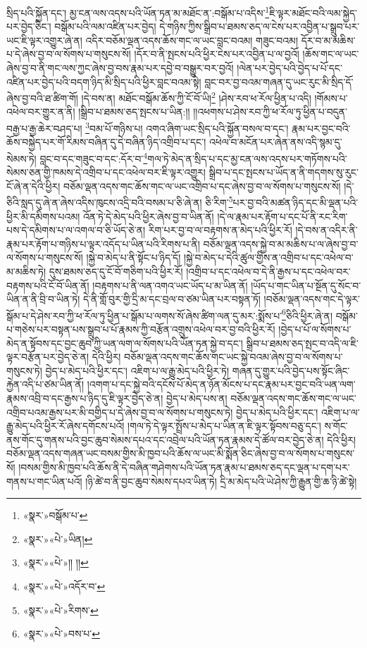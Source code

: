 སྲིད་པའི་སྐྱོན་དང་། མྱ་ངན་ལས་འདས་པའི་ཡོན་ཏན་མ་མཐོང་ན་:བསྒོམ་པ་འདིས་\footnote{«སྣར་»བསྒོམ་པ་}ཇི་ལྟར་མཐོང་བའི་ལམ་སྐྱེད་པར་བྱེད་ཅིང་། བསྒོམ་པའི་ལམ་འཛིན་པར་བྱེད། དེ་གཉིས་ཀྱིས་སྒྲིབ་པ་ཐམས་ཅད་ལ་ངེས་པར་འབྱིན་པ་སྒྲུབ་པར་ཡང་ཇི་ལྟར་འགྱུར་ཞེ་ན། འདིར་བཅོམ་ལྡན་འདས་ཆོས་གང་ལ་ཡང་བླང་བའམ། གཟུང་བའམ། དོར་བ་མ་མཆིས་པ་དེ་ཞེས་བྱ་བ་ལ་སོགས་པ་གསུངས་སོ། །དོར་བ་ནི་སྤངས་པའི་ཕྱིར་ངེས་པར་འབྱིན་པ་ལ་བྱའོ། །ཆོས་གང་ལ་ཡང་ཞེས་བྱ་བ་ནི་གང་ལས་ཀྱང་ཞེས་བྱ་བས་རྣམ་པར་དབྱེ་བ་བསྒྱུར་བར་བྱའོ། །ལེན་པར་བྱེད་པའི་བྱེད་པ་པོ་དང་འཛིན་པར་བྱེད་པའི་བདག་ཉིད་མི་སྲིད་པའི་ཕྱིར་བླང་བའམ་སྟེ། བླང་བར་བྱ་བའམ་གཞན་དུ་ཡང་རུང་མི་སྲིད་དོ་ཞེས་བྱ་བའི་ཐ་ཚིག་གོ། །དེ་བས་ན། མཐོང་བསྒོམ་ཆོས་ཀྱི་ངོ་བོ་ཡི།\footnote{«སྣར་»«པེ་»ཡིན།} །ཤེས་རབ་ཕ་རོལ་ཕྱིན་པ་འདི། །གོམས་པ་འཕེལ་བར་གྱུར་ན་ནི། །སྒྲིབ་པ་ཐམས་ཅད་སྤངས་པ་ཡིན:།། །།འཕགས་པ་ཤེས་རབ་ཀྱི་ཕ་རོལ་ཏུ་ཕྱིན་པ་བདུན་བརྒྱ་པ་རྒྱ་ཆེར་བཤད་པ། \footnote{«སྣར་»«པེ་»།། །། }བམ་པོ་གཉིས་པ། འགའ་ཞིག་ཡང་སྲིད་པའི་སྐྱོན་བསལ་བ་དང་། རྣམ་པར་བྱང་བའི་ཆོས་བསྐྱེད་པར་གོ་རིམས་བཞིན་དུ་དེ་བཞིན་ཉིད་འགྲིབ་པ་དང་། འཕེལ་བ་མངོན་པར་ཞེན་ནས་འདི་སྙམ་དུ་སེམས་ཏེ། བླང་བ་དང་གཟུང་བ་དང་:དོར་བ་\footnote{«སྣར་»«པེ་»འདོར་བ་}གལ་ཏེ་མེད་ན་སྲིད་པ་དང་མྱ་ངན་ལས་འདས་པར་གཏོགས་པའི་སེམས་ཅན་གྱི་ཁམས་དེ་འགྲིབ་པ་དང་འཕེལ་བར་ཇི་ལྟར་འགྱུར། སྒྲིབ་པ་དང་སྤངས་པ་ཡོད་ན་ནི་གདགས་སུ་རུང་ངོ་ཞེ་ན་དེའི་ཕྱིར། བཅོམ་ལྡན་འདས་གང་ཆོས་གང་ལ་ཡང་འགྲིབ་པ་དང་ཞེས་བྱ་བ་ལ་སོགས་པ་གསུངས་སོ། །དེ་ཅིའི་སླད་དུ་ཞེ་ན་ཞེས་འདིས་ཁུངས་འདྲི་བའི་བསམ་པ་ཅི་ཞེ་ན། ཅི་རིག་\footnote{«སྣར་»«པེ་»རིགས་}པར་བྱ་བའི་མཚན་ཉིད་དང་མི་ལྡན་པའི་ཕྱིར་མི་དམིགས་པའམ། འོན་ཏེ་དེ་མེད་པའི་ཕྱིར་ཞེས་བྱ་བ་ཡིན་ནོ། །དེ་ལ་རྣམ་པར་རྟོག་པ་དང་པོ་ནི་རང་རིག་པས་དེ་དམིགས་པ་ལ་འགལ་བ་ཅི་ཡོད་ཅེ་ན། རིག་པར་བྱ་བ་ལ་བརྟགས་ན་མེད་པའི་ཕྱིར་རོ། །དེ་བས་ན་འདིར་ནི་རྣམ་པར་རྟོག་པ་གཉིས་པ་ལྟར་འདོད་པ་ཡིན་པའི་རིགས་པ་ནི། བཅོམ་ལྡན་འདས་སྐྱེ་བ་མ་མཆིས་པ་ལ་ཞེས་བྱ་བ་ལ་སོགས་པ་གསུངས་སོ། །སྐྱེ་བ་མེད་པ་ནི་སྟོང་པ་ཉིད་དོ། །སྐྱེ་བ་མེད་པ་དེའི་ཚུལ་གྱིས་ན་འགྲིབ་པ་དང་འཕེལ་བ་མ་མཆིས་ཏེ། དུས་ཐམས་ཅད་དུ་ངོ་བོ་གཅིག་པའི་ཕྱིར་རོ། །འགྲིབ་པ་དང་འཕེལ་བ་དེ་ནི་རྒྱས་པ་དང་འཕེལ་བར་བརྟགས་པའི་ངོ་བོ་ཡིན་ནོ། །བརྟགས་པ་ནི་ལན་འགའ་ཡང་ཡོད་པ་མ་ཡིན་ནོ། །ཡོད་པ་གང་ཡིན་པ་སྔོན་དུ་སོང་བ་ཡིན་ན་ནི་བྲི་བ་ཡིན་ཏེ། དེ་ནི་གློ་བུར་གྱི་དྲི་མ་དང་བྲལ་བ་ཙམ་ཡིན་པར་བསྟན་ཏོ། །བཅོམ་ལྡན་འདས་གང་དེ་ལྟར་སྒོམ་པ་དེ་ཤེས་རབ་ཀྱི་ཕ་རོལ་ཏུ་ཕྱིན་པ་སྒོམ་པ་ལགས་སོ་ཞེས་ཚིག་ལན་དུ་མར་:སྨོས་པ་\footnote{«སྣར་»«པེ་»བས་པ་}ཅིའི་ཕྱིར་ཞེ་ན། བསྒོམ་པ་གཅེས་པར་བསྟན་པས་སྒྲུབ་པ་པོ་རྣམས་ཀྱི་བརྩོན་འགྲུས་འཕེལ་བར་བྱ་བའི་ཕྱིར་རོ། །བྱེད་པ་པོ་ལ་སོགས་པ་མེད་ན་སྟོབས་དང་བྱང་ཆུབ་ཀྱི་ཡན་ལག་ལ་སོགས་པའི་ཡོན་ཏན་སྐྱེ་བ་དང་། སྒྲིབ་པ་ཐམས་ཅད་སྤང་བ་འདི་ལ་ཇི་ལྟར་བརྩོན་པར་བྱེད་ཅེ་ན། དེའི་ཕྱིར། བཅོམ་ལྡན་འདས་གང་ཆོས་གང་ཡང་སྐྱེ་བའམ་ཞེས་བྱ་བ་ལ་སོགས་པ་གསུངས་ཏེ། བྱེད་པ་མེད་པའི་ཕྱིར་དང་། འཇིག་པ་ལ་རྒྱུ་མེད་པའི་ཕྱིར་ཏེ། གཞན་དུ་གྱུར་པའི་བྱེད་པས་སྟོང་ཞིང་རྐྱེན་འདི་པ་ཙམ་ཡིན་ནོ། །འགག་པ་དང་སྐྱེ་བའི་དངོས་པོ་མེད་ན་ཉོན་མོངས་པ་དང་རྣམ་པར་བྱང་བའི་ཡན་ལག་རྣམས་འབྲི་བ་དང་རྒྱས་པ་ཉིད་དུ་ཇི་ལྟར་བྱེད་ཅེ་ན། བྱེད་པ་མེད་པས་ན། བཅོམ་ལྡན་འདས་གང་ཆོས་གང་ལ་ཡང་འགྲིབ་པའམ་རྒྱས་པར་མི་བགྱིད་པ་དེ་ཞེས་བྱ་བ་ལ་སོགས་པ་གསུངས་ཏེ། བྱེད་པ་མེད་པའི་ཕྱིར་དང་། འཇིག་པ་ལ་རྒྱུ་མེད་པའི་ཕྱིར་རོ་ཞེས་དགོངས་པའོ། །གལ་ཏེ་དེ་ལྟར་སྤྲོས་པ་མེད་པ་ཡིན་ན་ཇི་ལྟར་སྟོབས་བཅུ་དང་། ས་གོང་ནས་གོང་དུ་གནས་པའི་བྱང་ཆུབ་སེམས་དཔའ་དང་འབྲེལ་པའི་ཡོན་ཏན་རྣམས་དེ་ཚོལ་བར་བྱེད་ཅེ་ན། དེའི་ཕྱིར། བཅོམ་ལྡན་འདས་གཞན་ཡང་བསམ་གྱིས་མི་ཁྱབ་པའི་ཆོས་ལ་ཡང་མི་སྨོན་ཅིང་ཞེས་བྱ་བ་ལ་སོགས་པ་གསུངས་སོ། །བསམ་གྱིས་མི་ཁྱབ་པའི་ཆོས་ནི་དེ་བཞིན་གཤེགས་པའི་ཡོན་ཏན་རྣམ་པ་ཐམས་ཅད་དང་ལྡན་པ་དག་པར་གནས་པ་གང་ཡིན་པའོ། །ཉི་ཚེ་བ་ནི་བྱང་ཆུབ་སེམས་དཔའ་ཡིན་ཏེ། དྲི་མ་མེད་པའི་ཡེ་ཤེས་ཀྱི་རྒྱུན་གྱི་ཆ་ཉི་ཚེ་སྟེ། 